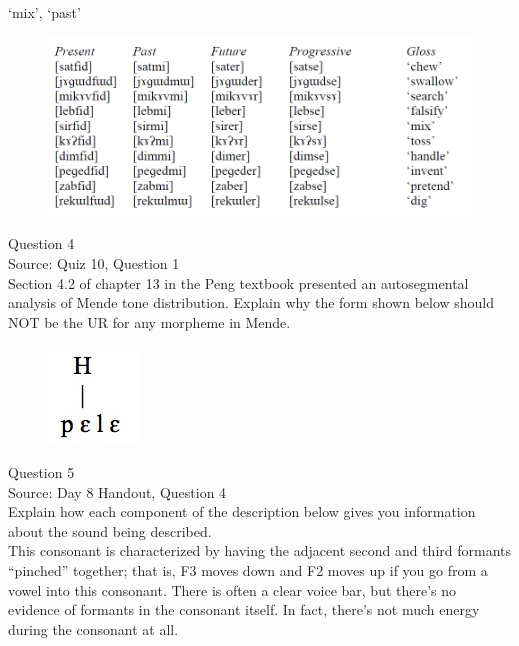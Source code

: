 \documentclass[12pt]{article}
\begin{document}
`mix', `past'

\begin{figure}[H]
\includegraphics{../images/final_dataset.png}
\end{figure}

\newpage

{\large Question 4}\\

Source: Quiz 10, Question 1\\

Section 4.2 of chapter 13 in the Peng textbook presented an autosegmental analysis of Mende tone distribution. Explain why the form shown below should NOT be the UR for any morpheme in Mende.\\

\begin{figure}[H]
\includegraphics{../images/mende_house_a.png}
\end{figure}

\newpage

{\large Question 5}\\

Source: Day 8 Handout, Question 4\\

Explain how each component of the description below gives you information about the sound being described.\\

This consonant is characterized by having the adjacent second and third formants ``pinched'' together; that is, F3 moves down and F2 moves up if you go from a vowel into this consonant. There is often a clear voice bar, but there’s no evidence of formants in the consonant itself. In fact, there’s not much energy during the consonant at all.
\end{document}
